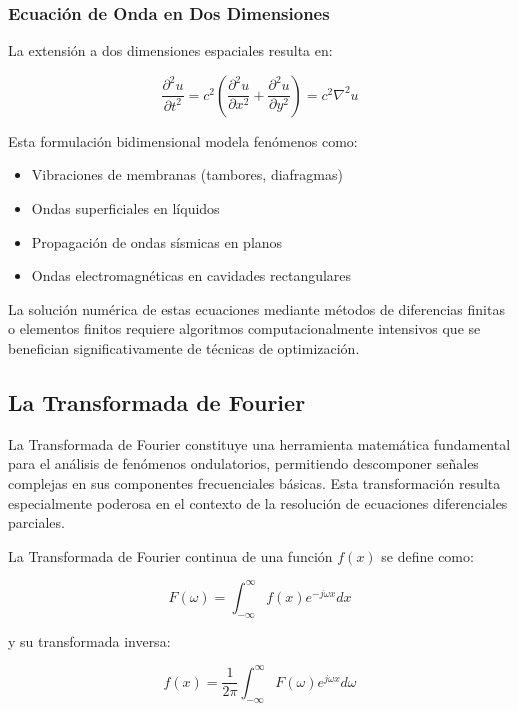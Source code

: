 \documentclass[a4paper]{article}
\begin{document}
\subsubsection{Ecuación de Onda en Dos Dimensiones}

La extensión a dos dimensiones espaciales resulta en:

\begin{equation}
\frac{\partial^2 u}{\partial t^2} = c^2 \left(\frac{\partial^2 u}{\partial x^2} + \frac{\partial^2 u}{\partial y^2}\right) = c^2 \nabla^2 u
\end{equation}

Esta formulación bidimensional modela fenómenos como:

\begin{itemize}
\item Vibraciones de membranas (tambores, diafragmas)
\item Ondas superficiales en líquidos
\item Propagación de ondas sísmicas en planos
\item Ondas electromagnéticas en cavidades rectangulares
\end{itemize}

La solución numérica de estas ecuaciones mediante métodos de diferencias finitas o elementos finitos requiere algoritmos computacionalmente intensivos que se benefician significativamente de técnicas de optimización.

\subsection{La Transformada de Fourier}

La Transformada de Fourier constituye una herramienta matemática fundamental para el análisis de fenómenos ondulatorios, permitiendo descomponer señales complejas en sus componentes frecuenciales básicas. Esta transformación resulta especialmente poderosa en el contexto de la resolución de ecuaciones diferenciales parciales.

La Transformada de Fourier continua de una función $f(x)$ se define como:

\begin{equation}
F(\omega) = \int_{-\infty}^{\infty} f(x) e^{-j\omega x} dx
\end{equation}

y su transformada inversa:

\begin{equation}
f(x) = \frac{1}{2\pi} \int_{-\infty}^{\infty} F(\omega) e^{j\omega x} d\omega
\end{equation}
\end{document}
